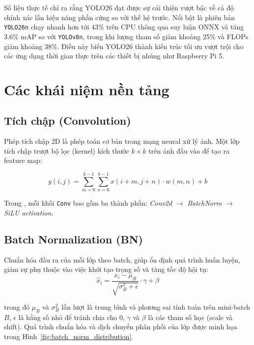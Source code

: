 Số liệu thực tế chỉ ra rằng YOLO26 đạt được sự cải thiện vượt bậc về cả độ chính xác lẫn hiệu năng phần cứng so với thế hệ trước. Nổi bật là phiên bản \texttt{YOLO26n} chạy nhanh hơn tới 43\% trên CPU thông qua suy luận ONNX và tăng 3.6\% mAP so với \texttt{YOLOv8n}, trong khi lượng tham số giảm khoảng 25\% và FLOPs giảm khoảng 38\%. Điều này biến YOLO26 thành kiến trúc tối ưu vượt trội cho các ứng dụng thời gian thực trên các thiết bị nhúng như Raspberry Pi 5.

\section{Các khái niệm nền tảng}
\label{sec:bg_concepts}

\subsection{Tích chập (Convolution)}

Phép tích chập 2D là phép toán cơ bản trong mạng neural xử lý ảnh. Một lớp tích chập trượt bộ lọc (kernel) kích thước $k \times k$ trên ảnh đầu vào để tạo ra feature map:

\begin{equation}
    y(i,j) = \sum_{m=0}^{k-1} \sum_{n=0}^{k-1} x(i+m, j+n) \cdot w(m,n) + b
    \label{eq:conv}
\end{equation}

Trong \yolo, mỗi khối \texttt{Conv} bao gồm ba thành phần: \textit{Conv2d} $\to$ \textit{BatchNorm} $\to$ \textit{SiLU activation}.

\subsection{Batch Normalization (BN)}

Chuẩn hóa đầu ra của mỗi lớp theo batch, giúp ổn định quá trình huấn luyện, giảm sự phụ thuộc vào việc khởi tạo trọng số và tăng tốc độ hội tụ:
\begin{equation}
    \hat{x}_i = \frac{x_i - \mu_B}{\sqrt{\sigma_B^2 + \epsilon}} \cdot \gamma + \beta
    \label{eq:batchnorm}
\end{equation}

\noindent trong đó $\mu_B$ và $\sigma_B^2$ lần lượt là trung bình và phương sai tính toán trên mini-batch $B$, $\epsilon$ là hằng số nhỏ để tránh chia cho 0, $\gamma$ và $\beta$ là các tham số học (scale và shift). Quá trình chuẩn hóa và dịch chuyển phân phối của lớp được minh họa trong Hình~\ref{fig:batch_norm_distribution}.

